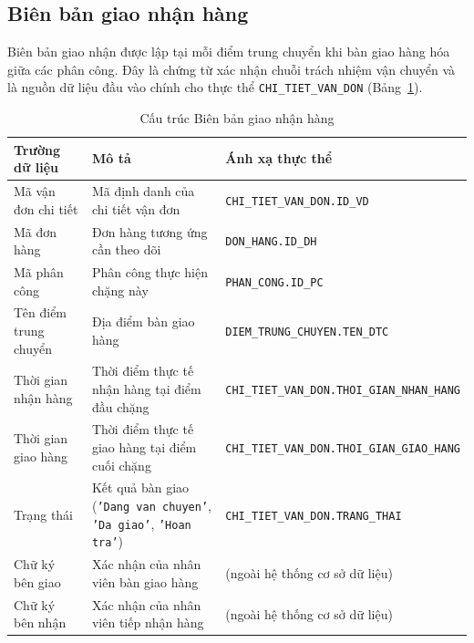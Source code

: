 \documentclass[11pt]{report}
\begin{document}
\subsection{Biên bản giao nhận hàng}
\label{subsec:bienban_giaonhan}

Biên bản giao nhận được lập tại mỗi điểm trung chuyển khi bàn giao hàng hóa giữa các phân công. Đây là chứng từ xác nhận chuỗi trách nhiệm vận chuyển và là nguồn dữ liệu đầu vào chính cho thực thể \texttt{CHI\_TIET\_VAN\_DON} (Bảng~\ref{tab:bienban_giaonhan}).

\begin{table}[H]
    \centering
    \renewcommand{\tabularxcolumn}[1]{m{#1}}
    \begin{tabularx}{\textwidth}{|l|>{\raggedright\arraybackslash}X|l|} \hline
        \rowcolor{teal!30}
        \textbf{Trường dữ liệu} & \textbf{Mô tả} & \textbf{Ánh xạ thực thể} \\ \hline
        Mã vận đơn chi tiết   & Mã định danh của chi tiết vận đơn                                                      & \texttt{\footnotesize CHI\_TIET\_VAN\_DON.ID\_VD} \\ \hline
        Mã đơn hàng           & Đơn hàng tương ứng cần theo dõi                                                        & \texttt{\footnotesize DON\_HANG.ID\_DH} \\ \hline
        Mã phân công          & Phân công thực hiện chặng này                                                          & \texttt{\footnotesize PHAN\_CONG.ID\_PC} \\ \hline
        Tên điểm trung chuyển & Địa điểm bàn giao hàng                                                                 & \texttt{\footnotesize DIEM\_TRUNG\_CHUYEN.TEN\_DTC} \\ \hline
        Thời gian nhận hàng   & Thời điểm thực tế nhận hàng tại điểm đầu chặng                                         & \texttt{\footnotesize CHI\_TIET\_VAN\_DON.THOI\_GIAN\_NHAN\_HANG} \\ \hline
        Thời gian giao hàng   & Thời điểm thực tế giao hàng tại điểm cuối chặng                                        & \texttt{\footnotesize CHI\_TIET\_VAN\_DON.THOI\_GIAN\_GIAO\_HANG} \\ \hline
        Trạng thái            & Kết quả bàn giao (\texttt{'Dang van chuyen'}, \texttt{'Da giao'}, \texttt{'Hoan tra'}) & \texttt{\footnotesize CHI\_TIET\_VAN\_DON.TRANG\_THAI} \\ \hline
        Chữ ký bên giao       & Xác nhận của nhân viên bàn giao hàng                                                   & (ngoài hệ thống cơ sở dữ liệu) \\ \hline
        Chữ ký bên nhận       & Xác nhận của nhân viên tiếp nhận hàng                                                  & (ngoài hệ thống cơ sở dữ liệu) \\ \hline
    \end{tabularx}
    \caption{Cấu trúc Biên bản giao nhận hàng}
    \label{tab:bienban_giaonhan}
\end{table}
\end{document}
